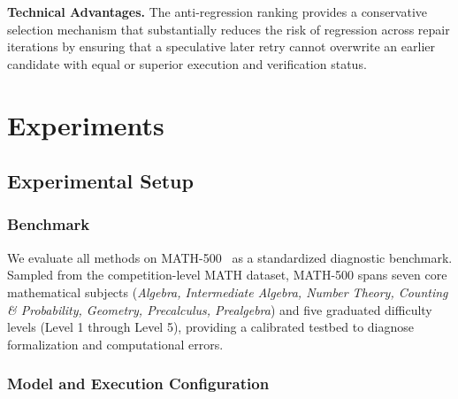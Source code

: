 \documentclass[conference,a4paper]{IEEEtran}
\begin{document}
\textbf{Technical Advantages.} The anti-regression ranking provides a conservative selection mechanism that substantially reduces the risk of regression across repair iterations by ensuring that a speculative later retry cannot overwrite an earlier candidate with equal or superior execution and verification status.

\section{Experiments}
\label{sec:experiments}

\subsection{Experimental Setup}

\subsubsection{Benchmark}

We evaluate all methods on MATH-500~\cite{lightman2024verify,hendrycks2021math} as a standardized diagnostic benchmark. Sampled from the competition-level MATH dataset, MATH-500 spans seven core mathematical subjects (\textit{Algebra, Intermediate Algebra, Number Theory, Counting \& Probability, Geometry, Precalculus, Prealgebra}) and five graduated difficulty levels (Level 1 through Level 5), providing a calibrated testbed to diagnose formalization and computational errors.

\subsubsection{Model and Execution Configuration}
\end{document}
